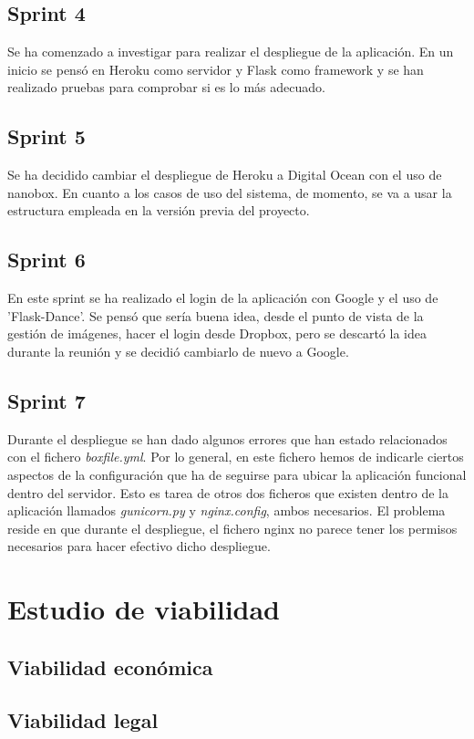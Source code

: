 \subsection{Sprint 4}
Se ha comenzado a investigar para realizar el despliegue de la aplicación. En un inicio se pensó en Heroku como servidor y Flask como framework y se han realizado pruebas para comprobar si es lo más adecuado. 
\subsection{Sprint 5}
Se ha decidido cambiar el despliegue de Heroku a Digital Ocean con el uso de nanobox. En cuanto a los casos de uso del sistema, de momento, se va a usar la estructura empleada en la versión previa del proyecto.
\subsection{Sprint 6}
En este sprint se ha realizado el login de la aplicación con Google y el uso de 'Flask-Dance'. Se pensó que sería buena idea, desde el punto de vista de la gestión de imágenes, hacer el login desde Dropbox, pero se descartó la idea durante la reunión y se decidió cambiarlo de nuevo a Google.
\subsection{Sprint 7}
Durante el despliegue se han dado algunos errores que han estado relacionados con el fichero \textit{boxfile.yml}. Por lo general, en este fichero hemos de indicarle ciertos aspectos de la configuración que ha de seguirse para ubicar la aplicación funcional dentro del servidor. Esto es tarea de otros dos ficheros que existen dentro de la aplicación llamados \textit{gunicorn.py} y \textit{nginx.config}, ambos necesarios. El problema reside en que durante el despliegue, el fichero nginx no parece tener los permisos necesarios para hacer efectivo dicho despliegue. 


\section{Estudio de viabilidad}

\subsection{Viabilidad económica}

\subsection{Viabilidad legal}


